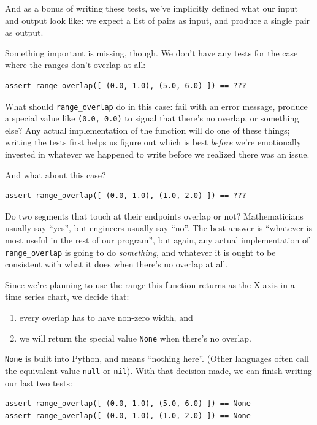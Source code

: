 \documentclass[]{book}
\begin{document}
And as a bonus of writing these tests, we've implicitly defined what our
input and output look like: we expect a list of pairs as input, and
produce a single pair as output.

Something important is missing, though. We don't have any tests for the
case where the ranges don't overlap at all:

\begin{verbatim}
assert range_overlap([ (0.0, 1.0), (5.0, 6.0) ]) == ???
\end{verbatim}

What should \texttt{range\_overlap} do in this case: fail with an error
message, produce a special value like \texttt{(0.0, 0.0)} to signal that
there's no overlap, or something else? Any actual implementation of the
function will do one of these things; writing the tests first helps us
figure out which is best \emph{before} we're emotionally invested in
whatever we happened to write before we realized there was an issue.

And what about this case?

\begin{verbatim}
assert range_overlap([ (0.0, 1.0), (1.0, 2.0) ]) == ???
\end{verbatim}

Do two segments that touch at their endpoints overlap or not?
Mathematicians usually say ``yes'', but engineers usually say ``no''.
The best answer is ``whatever is most useful in the rest of our
program'', but again, any actual implementation of
\texttt{range\_overlap} is going to do \emph{something}, and whatever it
is ought to be consistent with what it does when there's no overlap at
all.

Since we're planning to use the range this function returns as the X
axis in a time series chart, we decide that:

\begin{enumerate}
\item
  every overlap has to have non-zero width, and
\item
  we will return the special value \texttt{None} when there's no
  overlap.
\end{enumerate}

\texttt{None} is built into Python, and means ``nothing here''. (Other
languages often call the equivalent value \texttt{null} or
\texttt{nil}). With that decision made, we can finish writing our last
two tests:

\begin{verbatim}
assert range_overlap([ (0.0, 1.0), (5.0, 6.0) ]) == None
assert range_overlap([ (0.0, 1.0), (1.0, 2.0) ]) == None
\end{verbatim}
\end{document}
